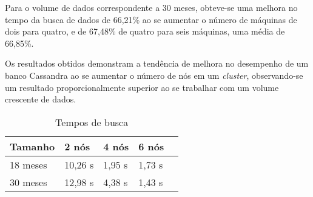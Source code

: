 Para o volume de dados correspondente a 30 meses, obteve-se uma melhora no tempo da busca de dados de 66,21\% ao se aumentar o número de máquinas de dois para quatro, e de 67,48\% de quatro para seis máquinas, uma média de 66,85\%. 

Os resultados obtidos demonstram a tendência de melhora no desempenho de um banco Cassandra ao se aumentar o número de nós em um \emph{cluster}, observando-se um resultado proporcionalmente superior ao se trabalhar com um volume crescente de dados.

\begin{table}[]
	\centering
	\caption{Tempos de busca}
	\label{tab:select_busca}
	\begin{tabular}{lllll}
		\textbf{Tamanho} & \textbf{2 nós} & \textbf{4 nós} & \textbf{6 nós} \\ \hline
		18 meses         & 10,26 s        & 1,95 s        & 1,73 s        \\ \hline
		30 meses         & 12,98 s        & 4,38 s        & 1,43 s         \\ \hline
	\end{tabular}
\end{table}

